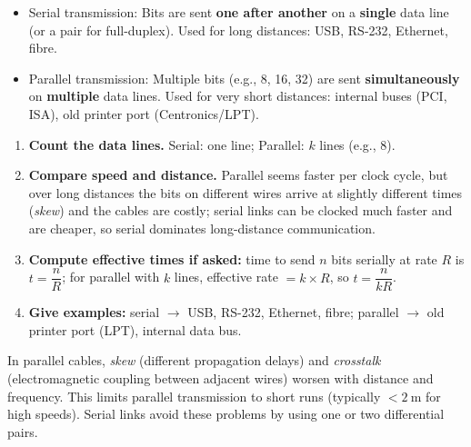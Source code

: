 \documentclass[11pt]{article}
\newcommand{\cle}[1]{{\popxbold\color{popdark}#1}}
\begin{document}
\begin{definition}
\begin{itemize}
\item \cle{Serial transmission}: Bits are sent \textbf{one after another} on a \textbf{single} data line (or a pair for full-duplex). Used for long distances: USB, RS-232, Ethernet, fibre.
\item \cle{Parallel transmission}: Multiple bits (e.g., 8, 16, 32) are sent \textbf{simultaneously} on \textbf{multiple} data lines. Used for very short distances: internal buses (PCI, ISA), old printer port (Centronics/LPT).
\end{itemize}
\end{definition}

\begin{methode}
\begin{enumerate}
\item \textbf{Count the data lines.} Serial: one line; Parallel: $k$ lines (e.g., 8).
\item \textbf{Compare speed and distance.} Parallel seems faster per clock cycle, but over long distances the bits on different wires arrive at slightly different times (\emph{skew}) and the cables are costly; serial links can be clocked much faster and are cheaper, so serial dominates long-distance communication.
\item \textbf{Compute effective times if asked:} time to send $n$ bits serially at rate $R$ is $t = \dfrac{n}{R}$; for parallel with $k$ lines, effective rate $= k \times R$, so $t = \dfrac{n}{kR}$.
\item \textbf{Give examples:} serial $\rightarrow$ USB, RS-232, Ethernet, fibre; parallel $\rightarrow$ old printer port (LPT), internal data bus.
\end{enumerate}
\end{methode}

\begin{attention}
In parallel cables, \emph{skew} (different propagation delays) and \emph{crosstalk} (electromagnetic coupling between adjacent wires) worsen with distance and frequency. This limits parallel transmission to short runs (typically $< 2\ \mathrm{m}$ for high speeds). Serial links avoid these problems by using one or two differential pairs.
\end{attention}
\end{document}
